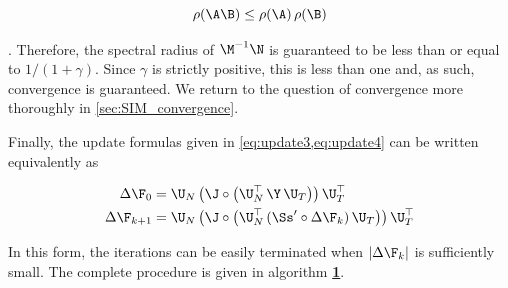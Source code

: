 \begin{equation}
    \label{eq:psd}
    \rho(\A\B) \leq \rho(\A) \, \rho(\B)
\end{equation}

\citep{Bhatia1997}. Therefore, the spectral radius of $\M^{-1}\N$ is guaranteed to be less than or equal to $1 / (1 + \gamma)$.  Since $\gamma$ is strictly positive, this is less than one and, as such, convergence is guaranteed. We return to the question of convergence more thoroughly in \cref{sec:SIM_convergence}. 

Finally, the update formulas given in \cref{eq:update3,eq:update4} can be written equivalently as 

\begin{align}
    \Delta \F_0     & = \U_N \, \big( \J  \circ \big( \U_N^\top \, \Y \, \U_T \big) \big) \, \U_T^\top  \\
    \Delta \F_{k+1} & = \U_N \, \big( \J  \circ \big( \U_N^\top \, (\Ss' \circ \Delta \F_{k})\, \U_T \big) \big) \, \U_T^\top
\end{align}

In this form, the iterations can be easily terminated when $|\Delta \F_{k}|$ is sufficiently small. The complete procedure is given in algorithm \hyperlink{al:SIM}{\textbf{1}}.

